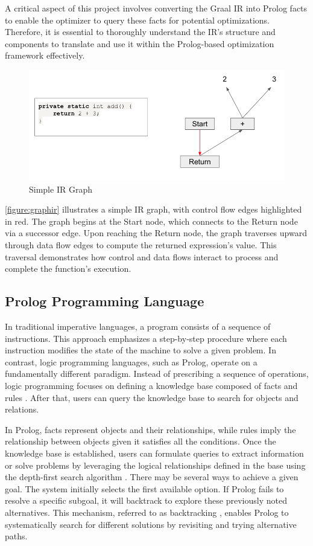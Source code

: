 A critical aspect of this project involves converting the Graal IR into Prolog facts to enable the optimizer to query these facts for potential optimizations. Therefore, it is essential to thoroughly understand the IR's structure and components to translate and use it within the Prolog-based optimization framework effectively.

\begin{figure}[h]
    \centering
    \includegraphics[width=1\textwidth]{Packages/graphir.png}
    \caption{Simple IR Graph}
    \label{figure:graphir}
\end{figure}

\autoref{figure:graphir} illustrates a simple IR graph, with control flow edges highlighted in red. The graph begins at the Start node, which connects to the Return node via a successor edge. Upon reaching the Return node, the graph traverses upward through data flow edges to compute the returned expression’s value. This traversal demonstrates how control and data flows interact to process and complete the function's execution.

\subsection{Prolog Programming Language}

In traditional imperative languages, a program consists of a sequence of instructions. This approach emphasizes a step-by-step procedure where each instruction modifies the state of the machine to solve a given problem. In contrast, logic programming languages, such as Prolog, operate on a fundamentally different paradigm. Instead of prescribing a sequence of operations, logic programming focuses on defining a knowledge base composed of facts and rules \cite{Bramer2013}. After that, users can query the knowledge base to search for objects and relations. 

In Prolog, facts represent objects and their relationships, while rules imply the relationship between objects given it satisfies all the conditions. Once the knowledge base is established, users can formulate queries to extract information or solve problems by leveraging the logical relationships defined in the base using the depth-first search algorithm \cite{Chowdhary2020}. There may be several ways to achieve a given goal. The system initially selects the first available option. If Prolog fails to resolve a specific subgoal, it will backtrack to explore these previously noted alternatives. This mechanism, referred to as backtracking \cite{Chowdhary2020}, enables Prolog to systematically search for different solutions by revisiting and trying alternative paths.

